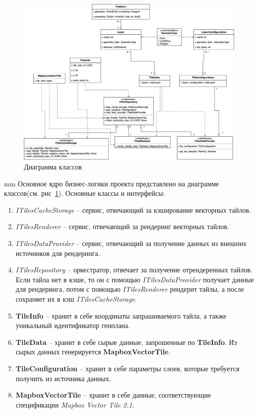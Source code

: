 \begin{figure}[H]
	\hspace*{-2.5 cm}\includegraphics[width=1.2\textwidth, left]{images/architecture/2}
	\caption{Диаграмма классов}
	\label{pic:architecture__classes-diagram}
\end{figure}
 mm
Основное ядро бизнес-логики проекта представлено на диаграмме классов(см. рис\ \ref{pic:architecture__classes-diagram}).
Основные классы и интерфейсы:
\begin{enumerate}
	\item \textit{ITilesCacheStorage} -- сервис, отвечающий за кэширование векторных тайлов.
	\item \textit{ITilesRenderer} -- сервис, отвечающий за рендеринг векторных тайлов.
	\item \textit{ITilesDataProvider} -- сервис, отвечающий за получение данных из внешних источников для рендеринга.
	\item \textit{ITilesRepository} -- оркестратор, отвечает за получение отрендеренных тайлов.
	Если тайла нет в кэше, то он с помощью \textit{ITilesDataProvider} получает данные для рендеринга, потом
	с помощью \textit{ITilesRenderer} рендерит тайлы, а после сохраняет их в кэш \textit{ITilesCacheStorage}.
	\item \textbf{TileInfo} -- хранит в себе координаты запрашиваемого тайла, а также уникальный идентификатор генплана.
	\item \textbf{TileData} -- хранит в себе сырые данные, запрошенные по \textbf{TileInfo}.
	Из сырых данных генерируется \textbf{MapboxVectorTile}.
	\item \textbf{TileConfiguration} -- хранит в себе параметры слоев, которые требуется получить из источника данных.
	\item \textbf{MapboxVectorTile} -- хранит в себе данные, соответствующие спецификации \textit{Mapbox Vector Tile 2.1}.
\end{enumerate}
